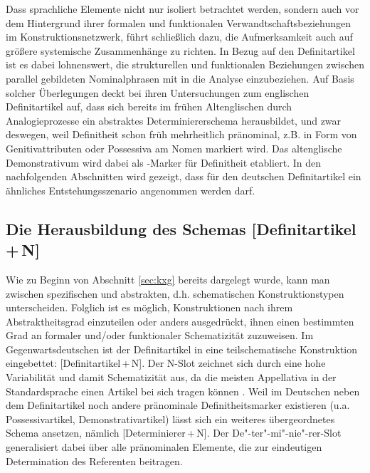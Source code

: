 Dass sprachliche Elemente nicht nur isoliert betrachtet werden, sondern auch vor dem Hintergrund ihrer formalen und funktionalen Verwandtschaftsbeziehungen im Konstruktionsnetzwerk, führt schließlich dazu, die Aufmerksamkeit auch auf größere systemische Zusammenhänge zu richten. In Bezug auf den Definitartikel ist es dabei lohnenswert, die strukturellen und funktionalen Beziehungen zwischen parallel gebildeten Nominalphrasen mit in die Analyse einzubeziehen. Auf Basis solcher Überlegungen deckt \textcite{Sommerer2011,Sommerer2012,Sommerer2015} bei ihren Untersuchungen zum englischen Definitartikel auf, dass sich bereits im frühen Altenglischen durch Analogieprozesse ein abstraktes Determiniererschema herausbildet, und zwar deswegen, weil Definitheit schon früh mehrheitlich pränominal, z.B. in Form von Genitivattributen oder Possessiva am Nomen markiert wird. Das altenglische Demonstrativum  wird dabei als -Marker für Definitheit etabliert. In den nachfolgenden Abschnitten wird gezeigt, dass für den deutschen Definitartikel ein ähnliches Entstehungsszenario angenommen werden darf. 

\subsection{Die Herausbildung des Schemas [Definitartikel\,+\,N]}\label{sec:schema}

Wie zu Beginn von Abschnitt \ref{sec:kxg} bereits dargelegt wurde, kann man zwischen spezifischen  und abstrakten, d.h. schematischen Konstruktionstypen unterscheiden.
Folglich ist es möglich, Konstruktionen nach ihrem Abstraktheitsgrad einzuteilen oder anders ausgedrückt, ihnen einen bestimmten Grad an formaler und/\-oder funktionaler Schematizität zuzuweisen. Im Gegenwartsdeutschen ist der Definitartikel in eine teilschematische Konstruktion eingebettet: [Definitartikel\,+\,N]. Der N-Slot zeichnet sich durch eine hohe Variabilität und damit Schematizität aus, da die meisten Appellativa in der Standardsprache einen Artikel bei sich tragen können \parencite[zu den Ausnahmen s.][]{DAvis2013}.
Weil im Deutschen neben dem Definitartikel noch andere pränominale Definitheitsmarker existieren (u.a. Possessivartikel, Demonstrativartikel) lässt sich ein weiteres übergeordnetes Schema ansetzen, nämlich [Determinierer\,+\,N]. Der De"-ter"-mi"-nie"-rer-Slot generalisiert dabei über alle pränominalen Elemente, die zur eindeutigen Determination des Referenten beitragen. 


